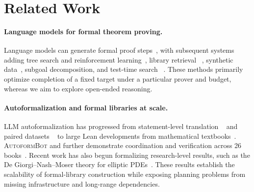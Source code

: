 
\makeatletter
\let\apx@addcontentsline\addcontentsline
\renewcommand{\addcontentsline}[3]{%
  \apx@addcontentsline{#1}{#2}{#3}%
  \def\apx@type{#1}\def\apx@toc{toc}%
  \ifx\apx@type\apx@toc \apx@addcontentsline{atoc}{#2}{#3}\fi
}
\section*{\contentsname}
\makeatother
\newpage

\section{Related Work}
\label{sec:related}

\paragraph{Language models for formal theorem proving.}
Language models can generate formal proof steps~\citep{polu2020generative},
with subsequent systems adding tree search and reinforcement
learning~\citep{lample2022hypertree,gloeckle2024abel}, library retrieval
~\citep{yang2023leandojo}, synthetic data~\citep{xin2024deepseekprover}, subgoal
decomposition, and test-time search
~\citep{hubert2024alphaproof,ren2025deepseekproverv2,lin2025goedelprover,
wang2025kimina}. These methods primarily optimize completion of a fixed target
under a particular prover and budget, whereas we aim to explore open-ended reasoning. 

\paragraph{Autoformalization and formal libraries at scale.}
LLM autoformalization has progressed from statement-level translation
~\citep{wu2022autoformalization} and paired datasets
~\citep{azerbayev2023proofnet,ying2024lean} to large Lean developments from
mathematical textbooks~\citep{urban2026130klinesformaltopology,
wang2026m2fautomatedformalizationmathematical,gloeckle2026automatic}.
\textsc{AutoformBot} and \Atlas further demonstrate coordination and
verification across 26 books~\citep{rammal2026atlas}. Recent work has also
begun formalizing research-level results, such as the De Giorgi--Nash--Moser
theory for elliptic PDEs~\citep{armstrong2026degiorgi}. These results establish
the scalability of formal-library construction while exposing planning
problems from missing infrastructure and long-range dependencies.

